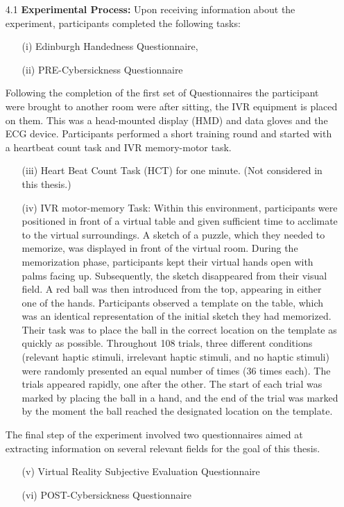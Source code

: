 \documentclass[12pt,oneside,openright]{report}
\begin{document}
\begin{enumerate}
    \item[4.1] \textbf{Experimental Process:} Upon receiving information about the experiment, participants completed the following tasks:
    \begin{enumerate}
        \item[(i)] Edinburgh Handedness Questionnaire,
        \item[(ii)] PRE-Cybersickness Questionnaire
    \end{enumerate}

    Following the completion of the first set of Questionnaires the participant were brought to another room were after sitting, the IVR equipment is placed on them. This was a head-mounted display (HMD) and data gloves and the ECG device. Participants performed a short training round and started with a heartbeat count task and IVR memory-motor task.

    \begin{enumerate}
      \item[(iii)] Heart Beat Count Task (HCT) for one minute. (Not considered in this thesis.)
      \item[(iv)] IVR motor-memory Task: Within this environment, participants were positioned in front of a virtual table and given sufficient time to acclimate to the virtual surroundings. A sketch of a puzzle, which they needed to memorize, was displayed in front of the virtual room. During the memorization phase, participants kept their virtual hands open with palms facing up. Subsequently, the sketch disappeared from their visual field. A red ball was then introduced from the top, appearing in either one of the hands. Participants observed a template on the table, which was an identical representation of the initial sketch they had memorized. Their task was to place the ball in the correct location on the template as quickly as possible. Throughout 108 trials, three different conditions (relevant haptic stimuli, irrelevant haptic stimuli, and no haptic stimuli) were randomly presented an equal number of times (36 times each). The trials appeared rapidly, one after the other. The start of each trial was marked by placing the ball in a hand, and the end of the trial was marked by the moment the ball reached the designated location on the template. 
    \end{enumerate}

The final step of the experiment involved two questionnaires aimed at extracting information on several relevant fields for the goal of this thesis.
\begin{enumerate}
\item[(v)] Virtual Reality Subjective Evaluation Questionnaire
\item[(vi)] POST-Cybersickness Questionnaire
\end{enumerate}
     

\end{enumerate}
\end{document}
